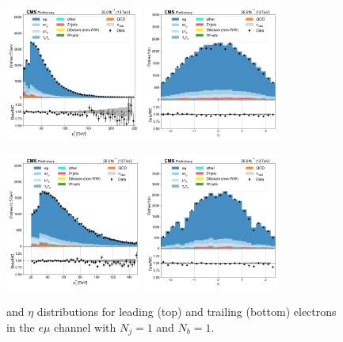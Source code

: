 \begin{figure}[htb!]
    \centering
    \includegraphics[width=0.4\textwidth]{chapters/Analysis/sectionPlots/figures/data_mc_overlays/emu_2016_cat_eq1_eq1_a_signal_linear_lepton_lepton1_pt}
    \includegraphics[width=0.4\textwidth]{chapters/Analysis/sectionPlots/figures/data_mc_overlays/emu_2016_cat_eq1_eq1_a_signal_linear_lepton_lepton1_eta}

    \includegraphics[width=0.4\textwidth]{chapters/Analysis/sectionPlots/figures/data_mc_overlays/emu_2016_cat_eq1_eq1_a_signal_linear_lepton_lepton2_pt}
    \includegraphics[width=0.4\textwidth]{chapters/Analysis/sectionPlots/figures/data_mc_overlays/emu_2016_cat_eq1_eq1_a_signal_linear_lepton_lepton2_eta}
    \caption{\pt and $\eta$ distributions for leading (top) and trailing
        (bottom) electrons in the $e\mu$ channel with $N_{j} = 1$ and
        $N_{b} = 1$.}
    \label{fig:analysis:plots:emu_3_kinematic}
\end{figure}

